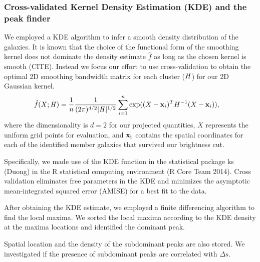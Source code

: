 \documentclass[usenatbib]{mn2e}
\def\Hmat{\mathbf{\it H}}
\begin{document}
\subsubsection{Cross-validated Kernel Density Estimation (KDE) and the peak finder} 
We employed a KDE algorithm to infer a smooth density distribution of the
galaxies.
It is known that the choice of the functional form of the smoothing kernel does
not dominate the density estimate $\hat{f}$ as long as the chosen kernel is
smooth (CITE). Instead we focus our effort to use cross-validation to obtain the optimal 2D smoothing
bandwidth matrix for each cluster ($\Hmat$) for our 2D Gaussian kernel. 
\begin{align}
	\hat{f}(X; \Hmat) &= \frac{1}{n} \frac{1}{(2\pi)^{d/2}|\Hmat|^{1/2}}
	\sum_{i=1}^n \exp((X-{\bf x}_i)^T H^{-1} (X-{\bf x}_i)),
\end{align}
where the dimensionality is $d=2$ for our projected quantities,
$X$ represents the uniform grid points for evaluation, and 
$\bf{x}_i$ contains the spatial coordinates for each of the identified member galaxies 
that survived our brightness cut.

Specifically, we made use of the KDE function in
the statistical package ks (Duong) in the R statistical computing environment 
(R Core Team 2014).
Cross validation eliminates free parameters in the KDE and minimizes
the asymptotic mean-integrated squared error (AMISE) for a best fit to the
data.

After obtaining the KDE estimate, we employed a finite differencing algorithm
to find the local maxima. We sorted the local maxima according to the KDE
density at the maxima locations and identified the dominant peak. 

Spatial location and the density of the subdominant peaks are also stored.
We investigated if the presence of subdominant peaks are correlated with
$\Delta s$. 
\end{document}
